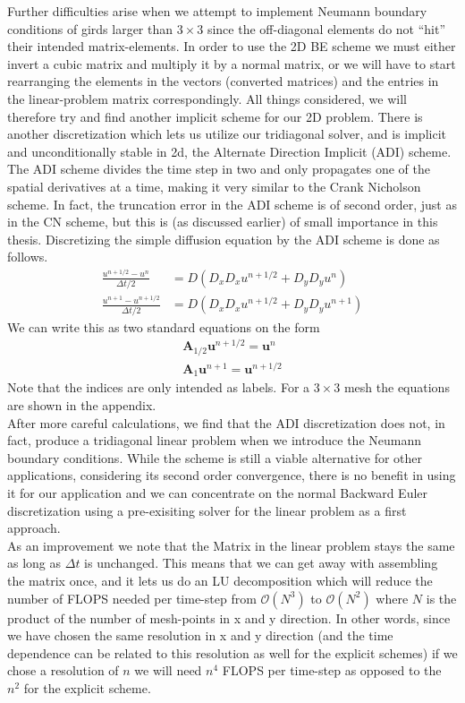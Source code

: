 Further difficulties arise when we attempt to implement Neumann boundary conditions of girds larger than $3\times3$ since the off-diagonal elements do not ``hit'' their intended matrix-elements. 
In order to use the 2D BE scheme we must either invert a cubic matrix and multiply it by a normal matrix, or we will have to start rearranging the elements in the vectors (converted matrices) and the entries in the linear-problem matrix correspondingly. 
All things considered, we will therefore try and find another implicit scheme for our 2D problem. 
There is another discretization which lets us utilize our tridiagonal solver, and is implicit and unconditionally stable in 2d, the Alternate Direction Implicit (ADI) scheme. 
The ADI scheme divides the time step in two and only propagates one of the spatial derivatives at a time, making it very similar to the Crank Nicholson scheme. 
In fact, the truncation error in the ADI scheme is of second order, just as in the CN scheme, but this is (as discussed earlier) of small importance in this thesis. 
Discretizing the simple diffusion equation by the ADI scheme is done as follows.
\begin{align*}
 \frac{u^{n+1/2}-u^n}{\Delta t/2} &= D\left(D_xD_xu^{n+1/2}+D_yD_yu^n\right)\\
 \frac{u^{n+1}-u^{n+1/2}}{\Delta t/2} &= D\left(D_xD_xu^{n+1/2}+D_yD_yu^{n+1}\right)
\end{align*}
We can write this as two standard equations on the form 
\begin{align*}
\mathbf{A}_{1/2}\mathbf{u}^{n+1/2} = \mathbf{u}^n \\
\mathbf{A}_{1}\mathbf{u}^{n+1} = \mathbf{u}^{n+1/2} 
\end{align*}
Note that the indices are only intended as labels. For a $3\times3$ mesh the equations are shown in the appendix.\\
After more careful calculations, we find that the ADI discretization does not, in fact, produce a tridiagonal linear problem when we introduce the Neumann boundary conditions. 
While the scheme is still a viable alternative for other applications, considering its second order convergence, there is no benefit in using it for our application and we can concentrate on the normal Backward Euler discretization using a pre-exisiting solver for the linear problem as a first approach. \\
As an improvement we note that the Matrix in the linear problem stays the same as long as $\Delta t$ is unchanged. This means that we can get away with assembling the matrix once, and it lets us do an LU decomposition which will reduce the number of FLOPS needed per time-step from $\mathcal{O}(N^3)$ to $\mathcal{O}(N^2)$ where $N$ is the product of the number of mesh-points in x and y direction. 
In other words, since we have chosen the same resolution in x and y direction (and the time dependence can be related to this resolution as well for the explicit schemes) if we chose a resolution of $n$ we will need $n^4$ FLOPS per time-step as opposed to the $n^2$ for the explicit scheme.





